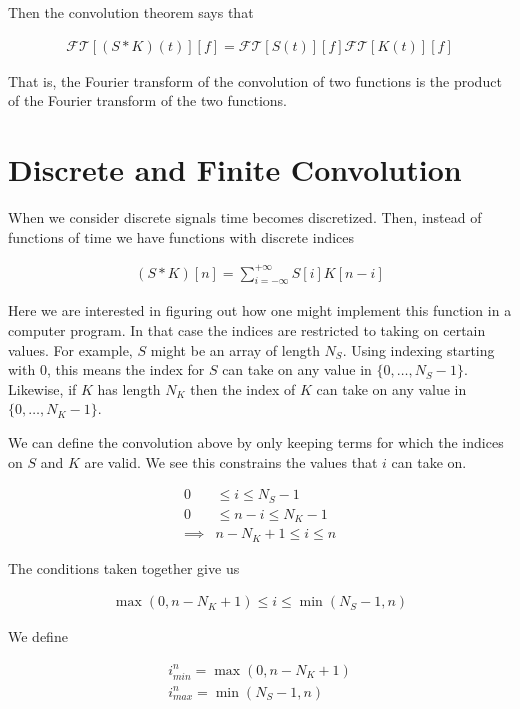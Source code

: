 \documentclass[12pt]{article}
\begin{document}
Then the convolution theorem says that

\begin{align}
\mathcal{FT}[(S\ast K)(t)][f] = \mathcal{FT}[S(t)][f] \mathcal{FT}[K(t)][f]
\end{align}

That is, the Fourier transform of the convolution of two functions is the product of the Fourier transform of the two functions.

\section{Discrete and Finite Convolution}

When we consider discrete signals time becomes discretized. Then, instead of functions of time we have functions with discrete indices

\begin{align}
(S \ast K)[n] = \sum_{i=-\infty}^{+\infty} S[i]K[n-i]
\end{align}

Here we are interested in figuring out how one might implement this function in a computer program. In that case the indices are restricted to taking on certain values. For example, $S$ might be an array of length $N_S$. Using indexing starting with $0$, this means the index for $S$ can take on any value in $\{0,\ldots,N_S-1\}$. Likewise, if $K$ has length $N_K$ then the index of $K$ can take on any value in $\{0, \ldots, N_K-1\}$. 

We can define the convolution above by only keeping terms for which the indices on $S$ and $K$ are valid. We see this constrains the values that $i$ can take on.

\begin{align}
0 &\le i \le N_S-1\\
0 &\le n-i \le N_K-1\\
\implies& n-N_K + 1 \le i \le n
\end{align}

The conditions taken together give us

\begin{align}
\max\left(0, n-N_K + 1\right) \le i \le \min\left(N_S-1, n\right)
\end{align}

We define

\begin{align}
i_{min}^n = \max\left(0, n-N_K+1\right)\\
i_{max}^n = \min\left(N_S-1, n\right)
\end{align}
\end{document}
